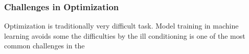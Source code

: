 \subsubsection{Challenges in Optimization}

Optimization is traditionally very difficult task. Model training in machine learning avoids some the difficulties by 
the ill conditioning is one of the most common challenges in the 
